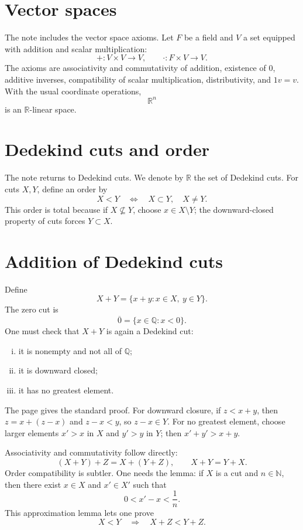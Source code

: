 \section{Vector spaces}

The note includes the vector space axioms.  Let \(F\) be a field and \(V\) a set equipped with addition and scalar multiplication:
\[
  +:V\times V\to V,\qquad \cdot:F\times V\to V.
\]
The axioms are associativity and commutativity of addition, existence of \(0\), additive inverses, compatibility of scalar multiplication, distributivity, and \(1v=v\).  With the usual coordinate operations,
\[
  \mathbb R^n
\]
is an \(\mathbb R\)-linear space.

\section{Dedekind cuts and order}

The note returns to Dedekind cuts.  We denote by \(\mathbb R\) the set of Dedekind cuts.  For cuts \(X,Y\), define an order by
\[
  X<Y\quad\Longleftrightarrow\quad X\subset Y,\quad X\neq Y.
\]
This order is total because if \(X\not\subseteq Y\), choose \(x\in X\setminus Y\); the downward-closed property of cuts forces \(Y\subset X\).

\section{Addition of Dedekind cuts}

Define
\[
  X+Y=\{x+y:x\in X,\ y\in Y\}.
\]
The zero cut is
\[
  \overline0=\{x\in\mathbb Q:x<0\}.
\]
One must check that \(X+Y\) is again a Dedekind cut:
\begin{enumerate}[(i)]
  \item it is nonempty and not all of \(\mathbb Q\);
  \item it is downward closed;
  \item it has no greatest element.

\end{enumerate}
The page gives the standard proof.  For downward closure, if \(z<x+y\), then \(z=x+(z-x)\) and \(z-x<y\), so \(z-x\in Y\).  For no greatest element, choose larger elements \(x'>x\) in \(X\) and \(y'>y\) in \(Y\); then \(x'+y'>x+y\).

Associativity and commutativity follow directly:
\[
  (X+Y)+Z=X+(Y+Z),\qquad X+Y=Y+X.
\]
Order compatibility is subtler.  One needs the lemma: if \(X\) is a cut and \(n\in\mathbb N\), then there exist \(x\in X\) and \(x'\in X'\) such that
\[
  0<x'-x<\frac1n.
\]
This approximation lemma lets one prove
\[
  X<Y\quad\Rightarrow\quad X+Z<Y+Z.
\]

